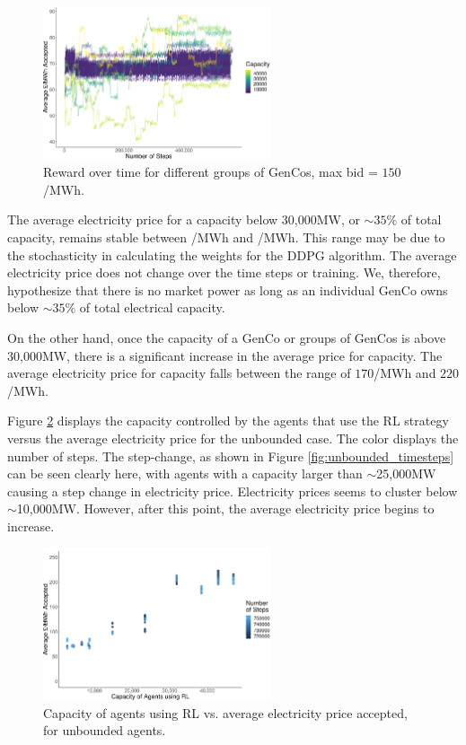 \begin{figure}
	\centering
	\includegraphics[width=0.6\textwidth]{Chapter7/Figures/results/bounded_results.pdf}
	\caption{Reward over time for different groups of GenCos, max bid = \textsterling $150$/MWh.}
	\label{fig:bounded_timesteps}
\end{figure}



The average electricity price for a capacity below 30,000MW, or ${\sim35\%}$ of total capacity, remains stable between /MWh and /MWh. This range may be due to the stochasticity in calculating the weights for the DDPG algorithm. The average electricity price does not change over the time steps or training. We, therefore, hypothesize that there is no market power as long as an individual GenCo owns below ${\sim}35\%$ of total electrical capacity. 

On the other hand, once the capacity of a GenCo or groups of GenCos is above 30,000MW, there is a significant increase in the average price for capacity. The average electricity price for capacity falls between the range of  \textsterling$170$/MWh and \textsterling$220$/MWh. 

Figure \ref{fig:unbounded_results_scatter} displays the capacity controlled by the agents that use the RL strategy versus the average electricity price for the unbounded case. The color displays the number of steps. The step-change, as shown in Figure \ref{fig:unbounded_timesteps} can be seen clearly here, with agents with a capacity larger than ${\sim}$25,000MW causing a step change in electricity price. Electricity prices seems to cluster below ${\sim}$10,000MW. However, after this point, the average electricity price begins to increase.



\begin{figure}[]
	\centering
	\includegraphics[width=0.6\textwidth]{Chapter7/Figures/results/unbounded_results_scatter.pdf}
	\caption{Capacity of agents using RL vs. average electricity price accepted, for unbounded agents.}
	\label{fig:unbounded_results_scatter}
\end{figure}


